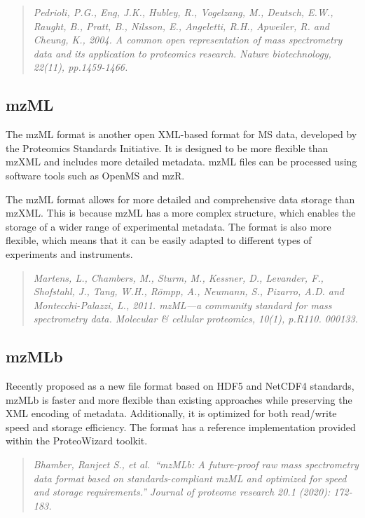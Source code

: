 \documentclass[
]{book}
\begin{document}
\begin{quote}
\emph{Pedrioli, P.G., Eng, J.K., Hubley, R., Vogelzang, M., Deutsch, E.W., Raught, B., Pratt, B., Nilsson, E., Angeletti, R.H., Apweiler, R. and Cheung, K., 2004. A common open representation of mass spectrometry data and its application to proteomics research. Nature biotechnology, 22(11), pp.1459-1466.}
\end{quote}

\hypertarget{mzml}{%
\subsection*{mzML}\label{mzml}}

The mzML format is another open XML-based format for MS data, developed by the Proteomics Standards Initiative. It is designed to be more flexible than mzXML and includes more detailed metadata. mzML files can be processed using software tools such as OpenMS and mzR.

The mzML format allows for more detailed and comprehensive data storage than mzXML. This is because mzML has a more complex structure, which enables the storage of a wider range of experimental metadata. The format is also more flexible, which means that it can be easily adapted to different types of experiments and instruments.

\begin{quote}
\emph{Martens, L., Chambers, M., Sturm, M., Kessner, D., Levander, F., Shofstahl, J., Tang, W.H., Römpp, A., Neumann, S., Pizarro, A.D. and Montecchi-Palazzi, L., 2011. mzML---a community standard for mass spectrometry data. Molecular \& cellular proteomics, 10(1), p.R110. 000133.}
\end{quote}

\hypertarget{mzmlb}{%
\subsection*{mzMLb}\label{mzmlb}}

Recently proposed as a new file format based on HDF5 and NetCDF4 standards, mzMLb is faster and more flexible than existing approaches while preserving the XML encoding of metadata. Additionally, it is optimized for both read/write speed and storage efficiency. The format has a reference implementation provided within the ProteoWizard toolkit.

\begin{quote}
\emph{Bhamber, Ranjeet S., et al.~``mzMLb: A future-proof raw mass spectrometry data format based on standards-compliant mzML and optimized for speed and storage requirements.'' Journal of proteome research 20.1 (2020): 172-183.}
\end{quote}
\end{document}
